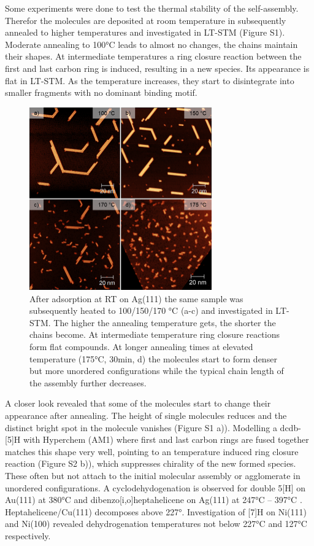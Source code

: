 
Some experiments were done to test the thermal stability of the self-assembly. Therefor the molecules are deposited at room temperature in subsequently annealed to higher temperatures and investigated in LT-STM (Figure S1). Moderate annealing to 100°C leads to almost no changes, the chains maintain their shapes. At intermediate temperatures a ring closure reaction between the first and last carbon ring is induced, resulting in a new species. Its appearance is flat in LT-STM. As the temperature increases, they start to disintegrate into smaller fragments with no dominant binding motif.

\begin{figure} \centering
	\includegraphics[width=0.7\textwidth]{./images/paper/helicene/fig-S1}
	\caption{After adsorption at RT on Ag(111) the same sample was subsequently heated to 100/150/170 °C (a-c) and investigated in LT-STM. The higher the annealing temperature gets, the shorter the chains become. At intermediate temperature ring closure reactions form flat compounds. At longer annealing times at elevated temperature (175°C, 30min, d) the molecules start to form denser but more unordered configurations while the typical chain length of the assembly further decreases.}
	\label{fig:hel-fig-S1}
\end{figure}

A closer look revealed that some of the molecules start to change their appearance after annealing.  The height of single molecules reduces and the distinct bright spot in the molecule vanishes (Figure S1 a)). Modelling a dcdb-[5]H with Hyperchem (AM1) where first and last carbon rings are fused together matches this shape very well, pointing to an temperature induced ring closure reaction (Figure S2 b)), which suppresses chirality of the new formed species. These often but not attach to the initial molecular assembly or agglomerate in unordered configurations. A cyclodehydogenation is observed for double 5[H] on Au(111) at 380°C\cite{} and dibenzo[i,o]heptahelicene on Ag(111) at 247°C – 397°C \cite{}. Heptahelicene/Cu(111) decomposes above 227°\cite{}. Investigation of [7]H on Ni(111) and Ni(100) revealed dehydrogenation temperatures not below 227°C and 127°C respectively.\cite{}

